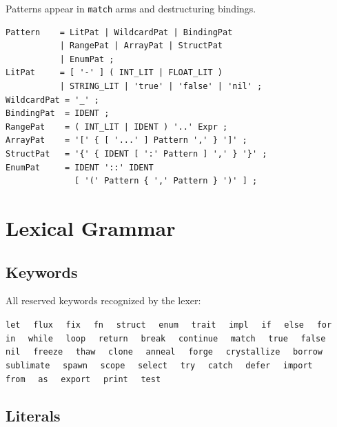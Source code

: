 Patterns appear in \texttt{match} arms and destructuring bindings.

\begin{lstlisting}[style=ebnf]
Pattern    = LitPat | WildcardPat | BindingPat
           | RangePat | ArrayPat | StructPat
           | EnumPat ;
LitPat     = [ '-' ] ( INT_LIT | FLOAT_LIT )
           | STRING_LIT | 'true' | 'false' | 'nil' ;
WildcardPat = '_' ;
BindingPat  = IDENT ;
RangePat    = ( INT_LIT | IDENT ) '..' Expr ;
ArrayPat    = '[' { [ '...' ] Pattern ',' } ']' ;
StructPat   = '{' { IDENT [ ':' Pattern ] ',' } '}' ;
EnumPat     = IDENT '::' IDENT
              [ '(' Pattern { ',' Pattern } ')' ] ;
\end{lstlisting}


\section{Lexical Grammar}

\subsection{Keywords}

All reserved keywords recognized by the lexer:

\begin{center}
\begin{minipage}{0.85\textwidth}
\small
\texttt{let}~~ \texttt{flux}~~ \texttt{fix}~~ \texttt{fn}~~
\texttt{struct}~~ \texttt{enum}~~ \texttt{trait}~~ \texttt{impl}~~
\texttt{if}~~ \texttt{else}~~ \texttt{for}~~ \texttt{in}~~
\texttt{while}~~ \texttt{loop}~~ \texttt{return}~~
\texttt{break}~~ \texttt{continue}~~ \texttt{match}~~
\texttt{true}~~ \texttt{false}~~ \texttt{nil}~~
\texttt{freeze}~~ \texttt{thaw}~~ \texttt{clone}~~
\texttt{anneal}~~ \texttt{forge}~~ \texttt{crystallize}~~
\texttt{borrow}~~ \texttt{sublimate}~~
\texttt{spawn}~~ \texttt{scope}~~ \texttt{select}~~
\texttt{try}~~ \texttt{catch}~~ \texttt{defer}~~
\texttt{import}~~ \texttt{from}~~ \texttt{as}~~ \texttt{export}~~
\texttt{print}~~ \texttt{test}
\end{minipage}
\end{center}

\subsection{Literals}

